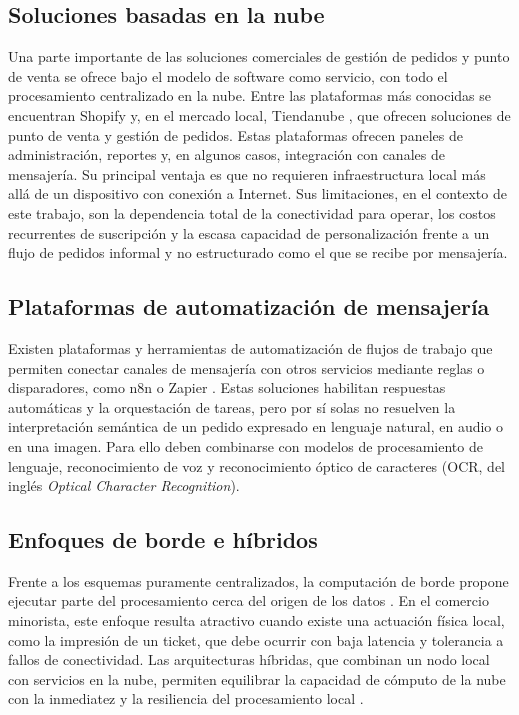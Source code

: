 \subsection{Soluciones basadas en la nube}
\label{subsec:soluciones_nube}

Una parte importante de las soluciones comerciales de gestión de pedidos y punto de venta se ofrece bajo el modelo de software como servicio, con todo el procesamiento centralizado en la nube. Entre las plataformas más conocidas se encuentran Shopify \cite{shopifypos} y, en el mercado local, Tiendanube \cite{tiendanubepdv}, que ofrecen soluciones de punto de venta y gestión de pedidos. Estas plataformas ofrecen paneles de administración, reportes y, en algunos casos, integración con canales de mensajería. Su principal ventaja es que no requieren infraestructura local más allá de un dispositivo con conexión a Internet. Sus limitaciones, en el contexto de este trabajo, son la dependencia total de la conectividad para operar, los costos recurrentes de suscripción y la escasa capacidad de personalización frente a un flujo de pedidos informal y no estructurado como el que se recibe por mensajería.

\subsection{Plataformas de automatización de mensajería}
\label{subsec:plataformas_mensajeria}

Existen plataformas y herramientas de automatización de flujos de trabajo que permiten conectar canales de mensajería con otros servicios mediante reglas o disparadores, como n8n \cite{n8n} o Zapier \cite{zapier}. Estas soluciones habilitan respuestas automáticas y la orquestación de tareas, pero por sí solas no resuelven la interpretación semántica de un pedido expresado en lenguaje natural, en audio o en una imagen. Para ello deben combinarse con modelos de procesamiento de lenguaje, reconocimiento de voz y reconocimiento óptico de caracteres (OCR, del inglés \textit{Optical Character Recognition}).

\subsection{Enfoques de borde e híbridos}
\label{subsec:enfoques_borde}

Frente a los esquemas puramente centralizados, la computación de borde propone ejecutar parte del procesamiento cerca del origen de los datos \cite{shi2016edge, satyanarayanan2017emergence}. En el comercio minorista, este enfoque resulta atractivo cuando existe una actuación física local, como la impresión de un ticket, que debe ocurrir con baja latencia y tolerancia a fallos de conectividad. Las arquitecturas híbridas, que combinan un nodo local con servicios en la nube, permiten equilibrar la capacidad de cómputo de la nube con la inmediatez y la resiliencia del procesamiento local \cite{tong2016hierarchical}.

